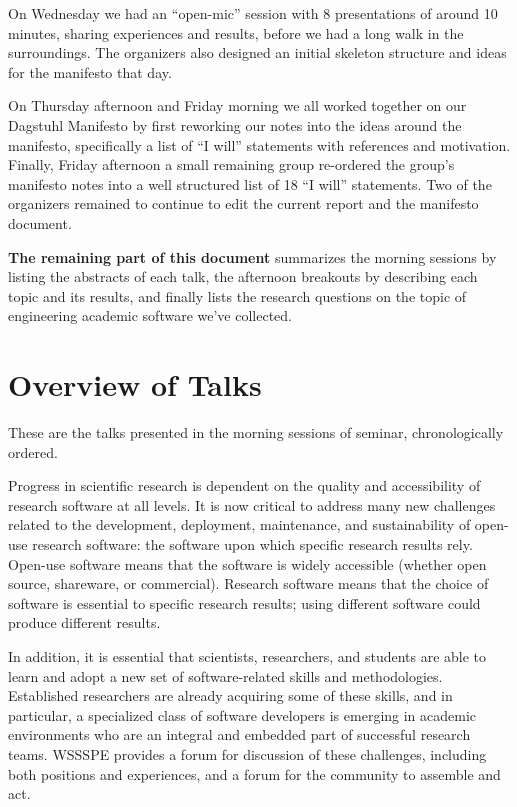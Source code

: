 \documentclass[a4paper,UKenglish]{dagrep}
\begin{document}
On Wednesday we had an ``open-mic'' session with 8 presentations of around 10 minutes, sharing experiences and results, before we had a long walk in the surroundings. The organizers also designed an initial skeleton structure and ideas for the manifesto that day.

On Thursday afternoon and Friday morning we all worked together on our Dagstuhl Manifesto by first reworking our notes into the ideas around the manifesto, specifically a list of ``I will'' statements with references and motivation. Finally, Friday afternoon a small remaining group re-ordered the group's manifesto notes into a well structured list of 18 ``I will'' statements. Two of the organizers remained to continue to edit the current report and the manifesto document.

\textbf{The remaining part of this document} summarizes the morning sessions by listing the abstracts of each talk, the afternoon breakouts by describing each topic and its results, and finally lists the research questions on the topic of engineering academic software we've collected. 

\tableofcontents

\section{Overview of Talks}

These are the talks presented in the morning sessions of seminar, chronologically ordered. 



Progress in scientific research is dependent on the quality and accessibility of research software at all levels. It is now critical to address many new challenges related to the development, deployment, maintenance, and sustainability of open-use research software: the software upon which specific research results rely.  Open-use software means that the software is widely accessible (whether open source, shareware, or commercial).  Research software means that the choice of software is essential to specific research results; using different software could produce different results.

In addition, it is essential that scientists, researchers, and students are able to learn and adopt a new set of software-related skills and methodologies. Established researchers are already acquiring some of these skills, and in particular, a specialized class of software developers is emerging in academic environments who are an integral and embedded part of successful research teams. WSSSPE provides a forum for discussion of these challenges, including both positions and experiences, and a forum for the community to assemble and act.
\end{document}
